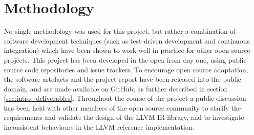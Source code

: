 

\section{Methodology}
\label{sec:methodology}

No single methodology was used for this project, but rather a combination of software development techniques (such as test-driven development and continuous integration) which have been shown to work well in practice for other open source projects. This project has been developed in the open from day one, using public source code repositories and issue trackers. To encourage open source adaptation, the software artefacts and the project report have been released into the public domain, and are made available on GitHub; as further described in section \ref{sec:intro_deliverables}. Throughout the course of the project a public discussion has been held with other members of the open source community to clarify the requirements and validate the design of the LLVM IR library, and to investigate inconsistent behaviours in the LLVM reference implementation.





